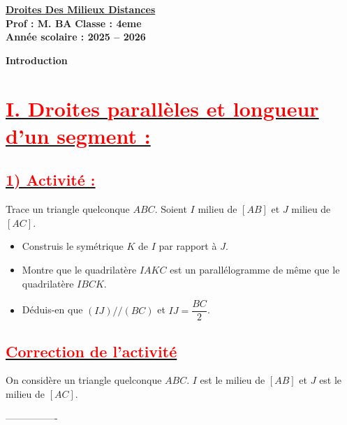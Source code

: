 \documentclass[12pt,a4paper]{article}
\begin{document}
\begin{center}
    \Large\textbf{\underline{Droites Des Milieux Distances}}\\[-0.1cm]
    \normalsize\textbf{Prof : M. BA} \hfill \textbf{Classe : 4eme}\\[-0.1cm]
    \textbf{Année scolaire : 2025 -- 2026}
\end{center}

\begin{center}
\textbf{Introduction}
\end{center}



\section*{\underline{\textbf{\textcolor{red}{I. Droites parallèles et longueur d'un segment : }}}}

\subsection*{\underline{\textbf{\textcolor{red}{1) Activité : }}}}

Trace un triangle quelconque $ABC$. Soient $I$ milieu de $[AB]$ et $J$ milieu de $[AC]$.

\begin{itemize}
    \item[a)] Construis le symétrique $K$ de $I$ par rapport à $J$.
    \item[b)] Montre que le quadrilatère $IAKC$ est un parallélogramme de même que le quadrilatère $IBCK$.
    \item[c)] Déduis-en que $(IJ) // (BC)$ et $IJ = \dfrac{BC}{2}$.
\end{itemize}

\subsection*{\underline{\textbf{\textcolor{red}{Correction de l'activité }}}}


On considère un triangle quelconque $ABC$.  
$I$ est le milieu de $[AB]$ et $J$ est le milieu de $[AC]$.

----------------
\end{document}
